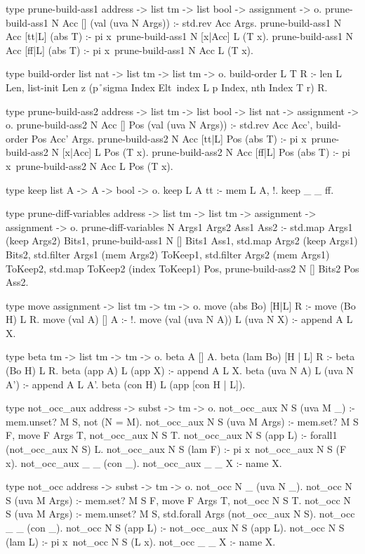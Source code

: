\begin{elpicode}
  type prune-build-ass1 address -> list tm -> 
                        list bool -> assignment -> o.
  prune-build-ass1 N Acc [] (val (uva N Args)) :- 
    std.rev Acc Args.
  prune-build-ass1 N Acc [tt|L] (abs T) :- 
    pi x\ prune-build-ass1 N [x|Acc] L (T x).
  prune-build-ass1 N Acc [ff|L] (abs T) :- 
    pi x\ prune-build-ass1 N Acc L (T x).

  type build-order list nat -> list tm -> list tm -> o.
  build-order L T R :-
    len L Len, list-init Len z 
      (p\r\ sigma Index Elt\ index L p Index, nth Index T r) R.

  type prune-build-ass2 address -> list tm -> list bool -> 
                      list nat -> assignment -> o.
  prune-build-ass2 N Acc [] Pos (val (uva N Args)) :- 
    std.rev Acc Acc', build-order Pos Acc' Args.
  prune-build-ass2 N Acc [tt|L] Pos (abs T) :- 
    pi x\ prune-build-ass2 N [x|Acc] L Pos (T x).
  prune-build-ass2 N Acc [ff|L] Pos (abs T) :- 
    pi x\ prune-build-ass2 N Acc L Pos (T x).

  type keep list A -> A -> bool -> o.
  keep L A tt :- mem L A, !.
  keep _ _ ff.

  type prune-diff-variables address -> list tm -> list tm -> 
                            assignment -> assignment -> o.
  prune-diff-variables N Args1 Args2 Ass1 Ass2 :-
    std.map Args1 (keep Args2) Bits1, 
    prune-build-ass1 N [] Bits1 Ass1,
    std.map Args2 (keep Args1) Bits2, 
    std.filter Args1 (mem Args2) ToKeep1,
    std.filter Args2 (mem Args1) ToKeep2,
    std.map ToKeep2 (index ToKeep1) Pos,
    prune-build-ass2 N [] Bits2 Pos Ass2.

  type move assignment -> list tm -> tm -> o.
  move (abs Bo)        [H|L] R :- move (Bo H) L R.
  move (val A)         []    A :- !.
  move (val (uva N A)) L     (uva N X) :- append A L X.

  type beta tm -> list tm -> tm -> o.
  beta A [] A.
  beta (lam Bo) [H | L] R :- beta (Bo H) L R.
  beta (app A) L (app X) :- append A L X.
  beta (uva N A) L (uva N A') :- append A L A'.
  beta (con H) L (app [con H | L]).

  type not_occ_aux address -> subst -> tm -> o.
  not_occ_aux N S (uva M _) :- mem.unset? M S, not (N = M).
  not_occ_aux N S (uva M Args) :- mem.set? M S F, 
    move F Args T, not_occ_aux N S T.
  not_occ_aux N S (app L) :- forall1 (not_occ_aux N S) L.
  not_occ_aux N S (lam F) :- pi x\ not_occ_aux N S (F x).
  not_occ_aux _ _ (con _).
  not_occ_aux _ _ X :- name X.
  
  type not_occ  address -> subst -> tm -> o.
  not_occ N _ (uva N _).
  not_occ N S (uva M Args) :- mem.set? M S F, 
    move F Args T, not_occ N S T.
  not_occ N S (uva M Args) :- mem.unset? M S, 
    std.forall Args (not_occ_aux N S).
  not_occ _ _ (con _).
  not_occ N S (app L) :- not_occ_aux N S (app L).
  not_occ N S (lam L) :- pi x\ not_occ N S (L x).
  not_occ _ _ X :- name X.


\end{elpicode}
